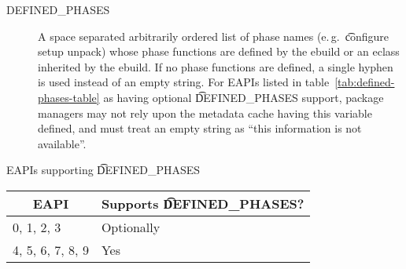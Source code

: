 \begin{description}
\item[DEFINED_PHASES]  A space separated arbitrarily ordered list
    of phase names (e.\,g.\ \t{configure setup unpack}) whose phase functions are defined by the
    ebuild or an eclass inherited by the ebuild. If no phase functions are defined, a single hyphen
    is used instead of an empty string. For EAPIs listed in table~\ref{tab:defined-phases-table}
    as having optional \t{DEFINED_PHASES} support, package managers may not rely upon the metadata
    cache having this variable defined, and must treat an empty string as ``this information is not
    available''.
\end{description}


\begin{centertable}{EAPIs supporting \t{DEFINED_PHASES}}
    \label{tab:defined-phases-table}
    \begin{tabular}{ll}
      \toprule
      \multicolumn{1}{c}{\textbf{EAPI}} &
      \multicolumn{1}{c}{\textbf{Supports \t{DEFINED_PHASES}?}} \\
      \midrule
      0, 1, 2, 3        & Optionally \\
      4, 5, 6, 7, 8, 9  & Yes        \\
      \bottomrule
    \end{tabular}
\end{centertable}


